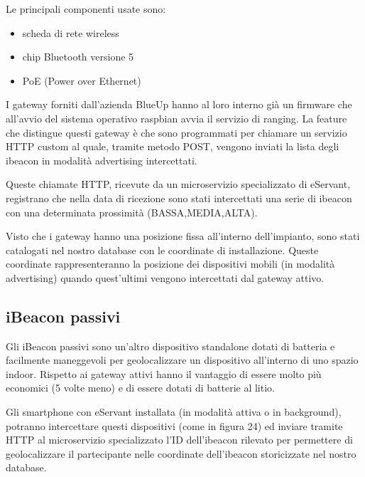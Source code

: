 Le principali componenti usate sono:
\begin{itemize}
    \item scheda di rete wireless
    \item chip Bluetooth versione 5
    \item PoE (Power over Ethernet)
\end{itemize}

I gateway forniti dall'azienda BlueUp hanno al loro interno già un firmware che all'avvio del sistema operativo
raspbian avvia il servizio di ranging.
La feature che distingue questi gateway è che sono programmati per chiamare un servizio HTTP custom 
al quale, tramite metodo POST, vengono inviati la lista degli ibeacon in modalità advertising intercettati.

Queste chiamate HTTP, ricevute da un microservizio specializzato di eServant, registrano che nella data
di ricezione sono stati intercettati una serie di ibeacon con una determinata prossimità (BASSA,MEDIA,ALTA).

Visto che i gateway hanno una posizione fissa all'interno dell'impianto, sono stati catalogati nel nostro
database con le coordinate di installazione.
Queste coordinate rappresenteranno la posizione dei dispositivi mobili (in modalità advertising) quando quest'ultimi
vengono intercettati dal gateway attivo.

\subsection{iBeacon passivi}
Gli iBeacon passivi sono un'altro dispositivo standalone dotati di batteria e facilmente maneggevoli per
geolocalizzare un dispositivo all'interno di uno spazio indoor.
Rispetto ai gateway attivi hanno il vantaggio di essere molto più economici (5 volte meno) e di essere
dotati di batterie al litio.

Gli smartphone con eServant installata (in modalità attiva o in background), potranno intercettare
questi dispositivi (come in figura 24) ed inviare tramite HTTP al microservizio specializzato l'ID dell'ibeacon rilevato
per permettere di geolocalizzare il partecipante nelle coordinate dell'ibeacon storicizzate nel nostro
database.


